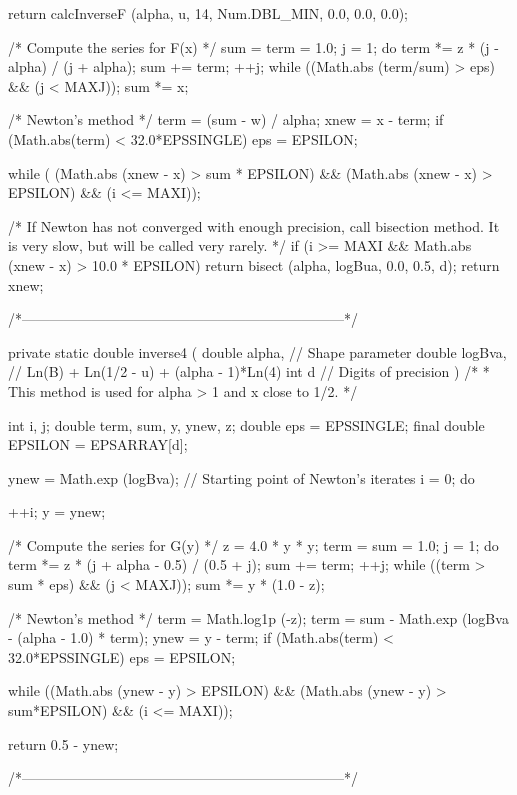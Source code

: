 \begin{code}
\begin{hide} {
      return calcInverseF (alpha, u, 14, Num.DBL_MIN, 0.0, 0.0, 0.0);
   }
{{         /* Compute the series for F(x) */
         sum = term = 1.0;
         j = 1;
         do {
            term *= z * (j - alpha) / (j + alpha);
            sum += term;
            ++j;
         } while ((Math.abs (term/sum) > eps) && (j < MAXJ));
         sum *= x;

         /* Newton's method */
         term = (sum - w) / alpha;
         xnew = x - term;
         if (Math.abs(term) < 32.0*EPSSINGLE)
            eps = EPSILON;

      } while ( (Math.abs (xnew - x) > sum * EPSILON) &&
               (Math.abs (xnew - x) > EPSILON) && (i <= MAXI));

      /* If Newton has not converged with enough precision, call bisection
         method. It is very slow, but will be called very rarely. */
      if (i >= MAXI && Math.abs (xnew - x) > 10.0 * EPSILON)
         return bisect (alpha, logBua, 0.0, 0.5, d);
      return xnew;
   }


   /*---------------------------------------------------------------------*/

   private static double inverse4 (
      double alpha,        // Shape parameter
      double logBva,       // Ln(B) + Ln(1/2 - u) + (alpha - 1)*Ln(4)
      int d                // Digits of precision
      )
   /*
    * This method is used for alpha > 1 and x close to 1/2.
    */
   {
      int i, j;
      double term, sum, y, ynew, z;
      double eps = EPSSINGLE;
      final double EPSILON = EPSARRAY[d];

      ynew = Math.exp (logBva);    // Starting point of Newton's iterates
      i = 0;
      do {
         ++i;
         y = ynew;

         /* Compute the series for G(y) */
         z = 4.0 * y * y;
         term = sum = 1.0;
         j = 1;
         do {
            term *= z * (j + alpha - 0.5) / (0.5 + j);
            sum += term;
            ++j;
         } while ((term > sum * eps) && (j < MAXJ));
         sum *= y * (1.0 - z);

         /* Newton's method */
         term = Math.log1p (-z);
         term = sum - Math.exp (logBva - (alpha - 1.0) * term);
         ynew = y - term;
         if (Math.abs(term) < 32.0*EPSSINGLE)
            eps = EPSILON;

      } while ((Math.abs (ynew - y) > EPSILON) &&
               (Math.abs (ynew - y) > sum*EPSILON) && (i <= MAXI));

      return 0.5 - ynew;
   }


   /*---------------------------------------------------------------------*/


\end{hide}
\end{code}
